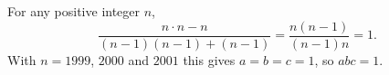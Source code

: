 For any positive integer $n$,
\[\dfrac{n\cdot n-n}{(n-1)(n-1)+(n-1)}=\dfrac{n(n-1)}{(n-1)n}=1 .\]
With $n=1999$, $2000$ and $2001$ this gives $a=b=c=1$, so $abc=\boxed{1}$.
